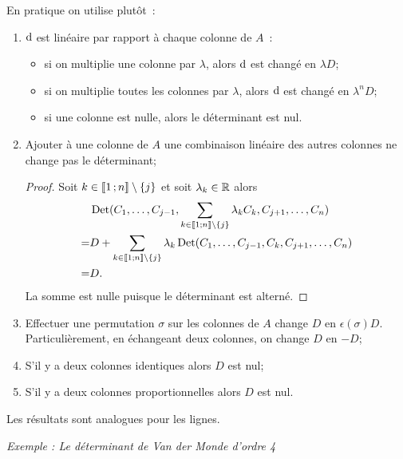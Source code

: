 En pratique on utilise plutôt~:
\begin{enumerate}
  \item \(\mathrm{d}\) est linéaire par rapport à chaque colonne de \(A\)~:
    \begin{itemize}
      \item si on multiplie une colonne par \(\lambda\), alors \(\mathrm{d}\) est
        changé en \(\lambda D\);
      \item si on multiplie toutes les colonnes par \(\lambda\), alors
        \(\mathrm{d}\) est changé en \(\lambda^n D\);
      \item si une colonne est nulle, alors le déterminant est nul.
    \end{itemize}
  \item Ajouter à une colonne de \(A\) une combinaison linéaire des autres
    colonnes ne change pas le déterminant;

    \begin{proof}
      Soit \(k \in \mathopen{\llbracket}1\mathclose{}\mathpunct{};n\mathclose{\rrbracket}\setminus\{j\}\) et soit
      \(\lambda_k \in \mathbb{R}\) alors
      \begin{align}
        &\operatorname{Det}(C_1, \ldots, C_{j-1}, \sum_{k \in
        \mathopen{\llbracket}1\mathclose{}\mathpunct{};n\mathclose{\rrbracket}\setminus\{j\}}\lambda_kC_k, C_{j+1},
        \ldots, C_n) \\
        =&D + \sum_{k \in \mathopen{\llbracket}1\mathclose{}\mathpunct{};n\mathclose{\rrbracket}\setminus\{j\}}\lambda_k
        \operatorname{Det}(C_1, \ldots, C_{j-1}, C_k, C_{j+1}, \ldots, C_n) \\
        =&D.
      \end{align}
      La somme est nulle puisque le déterminant est alterné.
    \end{proof}
  \item Effectuer une permutation \(\sigma\) sur les colonnes de \(A\)
    change \(D\) en \(\epsilon(\sigma)D\). Particulièrement, en échangeant
    deux colonnes, on change \(D\) en \(-D\);
  \item S'il y a deux colonnes identiques alors \(D\) est nul;
  \item S'il y a deux colonnes proportionnelles alors \(D\) est nul.
\end{enumerate}
Les résultats sont analogues pour les lignes.

\emph{Exemple : Le déterminant de Van der Monde d'ordre 4}

